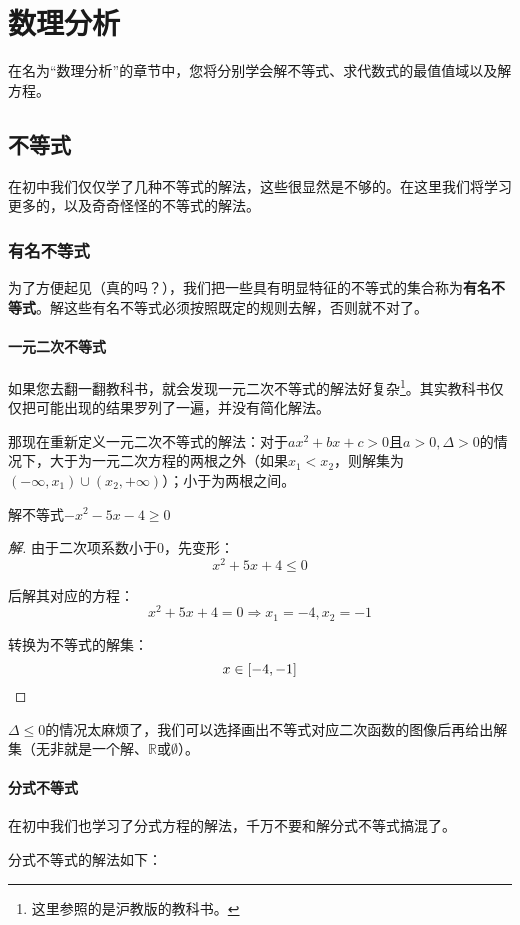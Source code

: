 \chapter{数理分析}
在名为“数理分析”的章节中，您将分别学会解不等式、求代数式的最值值域以及解方程。

\section{不等式}
在初中我们仅仅学了几种不等式的解法，这些很显然是不够的。在这里我们将学习更多的，以及奇奇怪怪的不等式的解法。

\subsection[有名]{有名不等式}
为了方便起见（真的吗？），我们把一些具有明显特征的不等式的集合称为\textbf{有名不等式}。解这些有名不等式必须按照既定的规则去解，否则就不对了。

\subsubsection{一元二次不等式}
如果您去翻一翻教科书，就会发现一元二次不等式的解法好复杂\footnote{这里参照的是沪教版的教科书。}。其实教科书仅仅把可能出现的结果罗列了一遍，并没有简化解法。

那现在重新定义一元二次不等式的解法：对于$ax^2+bx+c>0$且$a>0,\Delta>0$的情况下，大于为一元二次方程的两根之外（如果$x_1<x_2$，则解集为$(-\infty,x_1)\cup(x_2,+\infty)$）；小于为两根之间。

\begin{example}
	解不等式$-x^2-5x-4\geq0$
\end{example}
\begin{proof}[解]
	由于二次项系数小于$0$，先变形：\[x^2+5x+4\leq0\]

	后解其对应的方程：\[x^2+5x+4=0\Rightarrow x_1=-4,x_2=-1\]

	转换为不等式的解集：\[x\in[-4,-1]\qedhere\]
\end{proof}

$\Delta\leq0$的情况太麻烦了，我们可以选择画出不等式对应二次函数的图像后再给出解集（无非就是一个解、$\mathbb{R}$或$\emptyset$）。

\subsubsection{分式不等式}
在初中我们也学习了分式方程的解法，千万不要和解分式不等式搞混了。

分式不等式的解法如下：

